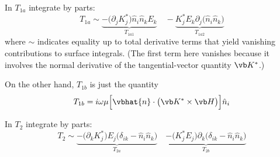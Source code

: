 In $T_{1a}$ integrate by parts:
$$ T_{1a}\sim 
   \underbrace{-\big(\partial_j K^*_j\big)\hat n_i \hat n_k E_k}_{T_{1a1}}
  \quad
   -\underbrace{K^*_j E_k \partial_j \Big( \hat{n}_i \hat{n}_k \Big)}_{T_{1a2}}
$$
where $\sim$ indicates equality up to total derivative terms that yield
vanishing contributions to surface integrals.
(The first term here vanishes because it involves the normal derivative
of the tangential-vector quantity $\vb K^*$.)

On the other hand, $T_{1b}$ is just the quantity
$$ T_{1b} = i\omega \mu
   \Big[ \vbhat{n} \cdot \big(\vb K^* \times \vb H\big) \Big] \hat{n}_i 
$$


In $T_{2}$ integrate by parts:
$$ T_{2}\sim 
   \underbrace{-\Big(\partial_k K^*_j\Big) E_j \Big(\delta_{ik}-\hat{n}_i \hat{n}_k\Big)}_{T_{2a}}
 \quad
   \underbrace{-\Big(K_j^* E_j\Big)
 \partial_k \Big(\delta_{ik}-\hat{n}_i \hat{n}_k\Big)}_{T_{2b}}
$$
